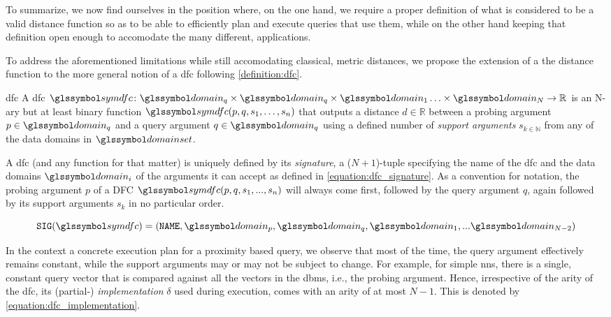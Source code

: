 To summarize, we now find ourselves in the position where, on the one hand, we require a proper definition of what is considered to be a valid distance function so as to be able to efficiently plan and execute queries that  use them, while on the other hand keeping that definition open enough to accomodate the many different, applications.

To address the aforementioned limitations while still accomodating classical, metric distances, we propose the extension of a the distance function to the more general notion of a \acrfull{dfc} following \cref{definition:dfc}.

\begin{definition}[label=definition:dfc]{\acrlong{dfc}}{}
    A \acrshort{dfc} $\symdfc \colon \domain_q \times \domain_q \times \domain_{1} \ldots \times \domain_{N} \to \mathbb{R}$ is an N-ary but at least binary function $\symdfc(p,q,s_1,\ldots,s_n)$ that outputs a distance $d \in \mathbb{R}$ between a probing argument $p \in \domain_q$ and a query argument $q \in \domain_q$ using a defined number of \emph{support arguments} $s_{k \in \mathbb{N}}$ from any of the data domains in $\domainset$.
\end{definition}

A \acrshort{dfc} (and any function for that matter) is uniquely defined by its \emph{signature}, a ($N+1$)-tuple specifying the name of the \acrshort{dfc} and the data domains $\domain_i$ of the arguments it can accept as defined in \cref{equation:dfc_signature}. As a convention for notation, the probing argument $p$ of a DFC $\symdfc(p,q,s_1,...,s_n)$ will always come first, followed by the query argument $q$, again followed by its support arguments $s_k$ in no particular order.

\begin{equation}
    \label{equation:dfc_signature}
    \texttt{SIG}(\symdfc) = (\mathtt{NAME}, \domain_p, \domain_q, \domain_1,... \domain_{N-2})
\end{equation}

In the context a concrete execution plan for a proximity based query, we observe that most of the time, the query argument effectively remains constant, while the support arguments may or may not be subject to change. For example, for simple \acrshort{nns}, there is a single, constant query vector that is compared against all the vectors in the \acrshort{dbms}, i.e., the probing argument. Hence, irrespective of the arity of the \acrshort{dfc}, its (partial-) \emph{implementation} $\delta$ used during execution, comes with an arity of at most $N-1$. This is denoted by \cref{equation:dfc_implementation}.

